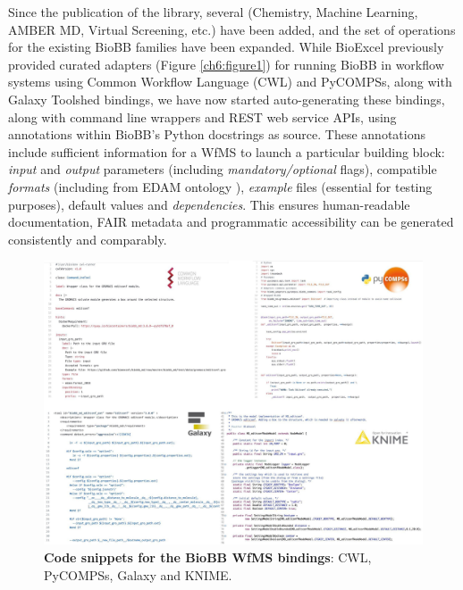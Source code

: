 Since the publication of the library, several  (Chemistry, Machine Learning, AMBER MD, Virtual Screening, etc.) have been added, and the set of operations for the existing BioBB families have been expanded.
While BioExcel previously provided curated adapters (Figure \vref{ch6:figure1}) for running BioBB in workflow systems using Common Workflow Language (CWL) and PyCOMPSs, along with Galaxy Toolshed bindings, we have now started auto-generating these bindings, along with command line wrappers and REST web service APIs, using annotations within BioBB's Python docstrings as source.
These annotations include sufficient information for a WfMS to launch a particular building block: \emph{input} and \emph{output} parameters (including \emph{mandatory/optional} flags), compatible \emph{formats} (including from EDAM ontology \cite{Ison 2013}), \emph{example} files (essential for testing purposes), default values and \emph{dependencies}.
This ensures human-readable documentation, FAIR metadata and programmatic accessibility can be generated consistently and comparably.

\begin{figure}%
  \includegraphics[width=\textwidth]{figures/ch06/figure1.jpg}
	\caption[Code snippets for the BioBB WfMS bindings]{
    \textbf{Code snippets for the BioBB WfMS bindings}: 
    CWL, PyCOMPSs, Galaxy and KNIME.}
  \label{ch6:figure1}
\end{figure}


